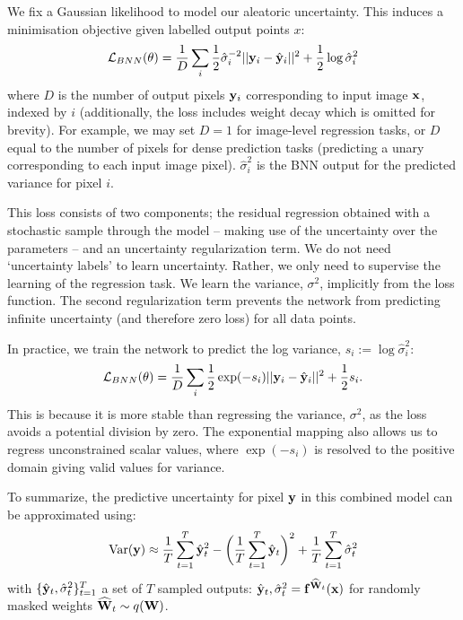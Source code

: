 We fix a Gaussian likelihood to model our aleatoric uncertainty.
This induces a minimisation objective given labelled output points $x$:
\begin{equation}
\mathcal{L}_{BNN}(\theta) = \frac{1}{D} \sum_i \frac{1}{2} \hat{\sigma}^{-2}_i ||\mathbf{y}_i-\hat{\mathbf{y}}_i||^2 + \frac{1}{2} \log{\hat{\sigma}_i^2}
\end{equation}
where $D$ is the number of output pixels $\mathbf{y}_i$ corresponding to input image $\mathbf{x}$, indexed by $i$ (additionally, the loss includes weight decay which is omitted for brevity). For example, we may set $D=1$ for image-level regression tasks, or $D$ equal to the number of pixels for dense prediction tasks (predicting a unary corresponding to each input image pixel). $\hat{\sigma}^2_i$ is the BNN output for the predicted variance for pixel $i$.

This loss consists of two components; the residual regression obtained with a stochastic sample through the model -- making use of the uncertainty over the parameters  -- and an uncertainty regularization term. We do not need `uncertainty labels' to learn uncertainty. Rather, we only need to supervise the learning of the regression task. We learn the variance, $\sigma^2$, implicitly from the loss function. The second regularization term prevents the network from predicting infinite uncertainty (and therefore zero loss) for all data points.

In practice, we train the network to predict the log variance, $s_i := \log \hat{\sigma}_i^2$: 
\begin{equation}
\mathcal{L}_{BNN}(\theta) = \frac{1}{D} \sum_i \frac{1}{2} \exp (-s_i) ||\mathbf{y}_i-\hat{\mathbf{y}}_i||^2 + \frac{1}{2} s_i.
\label{eqn:aleatoric_regression_loss}
\end{equation}
This is because it is more stable than regressing the variance, $\sigma^2$, as the loss avoids a potential division by zero. The exponential mapping also allows us to regress unconstrained scalar values, where $\exp(-s_i)$ is resolved to the positive domain giving valid values for variance.

To summarize, the predictive uncertainty for pixel $\mathbf{y}$ in this combined model can be approximated using:
\begin{equation}
\text{Var}(\mathbf{y}) \approx \frac{1}{T} \sum_{t=1}^T \hat{\mathbf{y}}_{t}^2
- \bigg( \frac{1}{T} \sum_{t=1}^T \hat{\mathbf{y}}_{t} \bigg)^2 + \frac{1}{T} \sum_{t=1}^T \hat{\sigma}_{t}^2
\end{equation}
with $\{ \hat{\mathbf{y}}_{t}, \hat{\sigma}_{t}^2 \}_{t=1}^T$ a set of $T$ sampled outputs: $\hat{\mathbf{y}}_{t}, \hat{\sigma}_{t}^2 = \mathbf{f}^{{\widehat{\mathbf{W}}}_t}(\mathbf{x})$ for randomly masked weights ${\widehat{\mathbf{W}}}_t \sim q(\mathbf{W})$.


